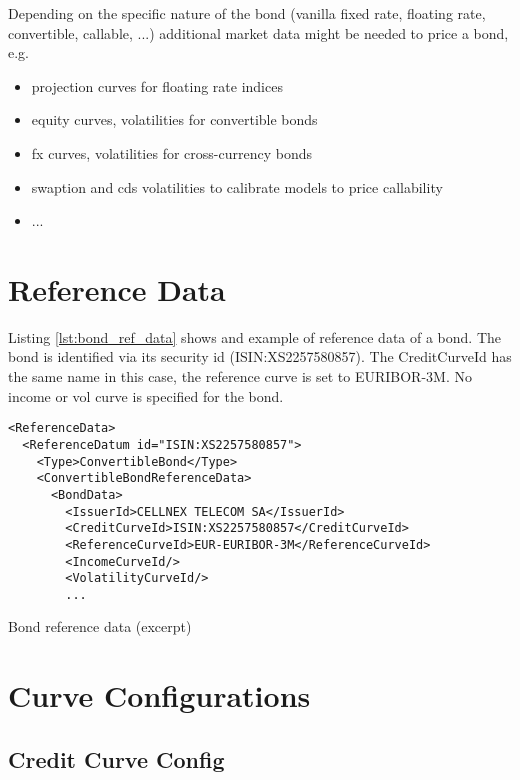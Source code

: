 \documentclass[12pt, a4paper]{article}
\begin{document}
Depending on the specific nature of the bond (vanilla fixed rate, floating rate, convertible, callable, ...) additional
market data might be needed to price a bond, e.g.

\begin{itemize}
\item projection curves for floating rate indices
\item equity curves, volatilities for convertible bonds
\item fx curves, volatilities for cross-currency bonds
\item swaption and cds volatilities to calibrate models to price callability 
\item ...
\end{itemize}

\section{Reference Data}\label{refdata}

Listing \ref{lst:bond_ref_data} shows and example of reference data of a bond.  The bond is identified via its security
id (ISIN:XS2257580857). The CreditCurveId has the same name in this case, the reference curve is set to EURIBOR-3M. No
income or vol curve is specified for the bond.

\begin{listing}[H]
\begin{verbatim}
<ReferenceData>
  <ReferenceDatum id="ISIN:XS2257580857">
    <Type>ConvertibleBond</Type>
    <ConvertibleBondReferenceData>
      <BondData>
        <IssuerId>CELLNEX TELECOM SA</IssuerId>
        <CreditCurveId>ISIN:XS2257580857</CreditCurveId>
        <ReferenceCurveId>EUR-EURIBOR-3M</ReferenceCurveId>
        <IncomeCurveId/>
        <VolatilityCurveId/>
        ...
\end{verbatim}
\caption{Bond reference data (excerpt)}
\label{lst:bond_ref_data}
\end{listing}

\section{Curve Configurations}\label{curveconfigs}

\subsection{Credit Curve Config}
\end{document}
